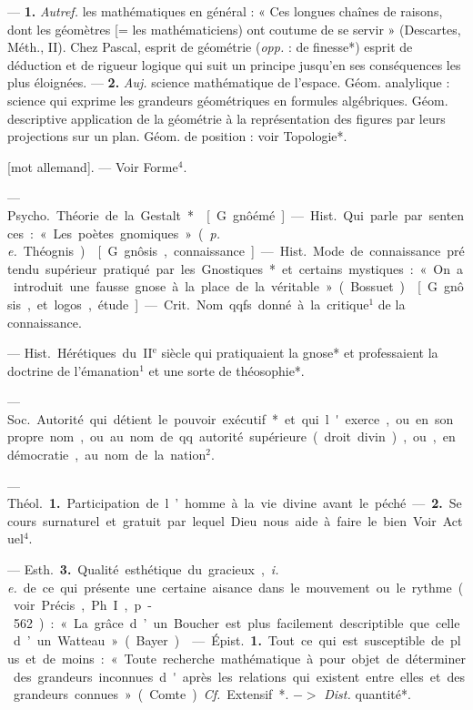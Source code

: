 \begin{itemize}[leftmargin=1cm, label=, itemsep=1pt]
 — {\bf 1.} {\it Autref.} les mathématiques en général : « Ces longues
chaînes de raisons, dont les géomètres [= les mathématiciens) ont
coutume de se servir » (Descartes,
Méth., II). Chez Pascal, esprit de
géométrie ({\it opp.} : de finesse*)
esprit de déduction et de rigueur
logique qui suit un principe jusqu'en ses conséquences les plus
éloignées. — {\bf 2.} {\it Auj.} science mathématique de l’espace. Géom. analylique : science qui exprime les
grandeurs géométriques en formules
algébriques. Géom. descriptive
application de la géométrie à la représentation des figures par leurs
projections sur un plan. Géom. de
position : voir Topologie*.

 [mot allemand]. — Voir Forme$^4$.

 — \si{Psycho.} Théorie de la
Gestalt*.

 [G. gnôémé]. — \si{Hist.} Qui
parle par sentences : « Les poètes
gnomiques » ({\it p. e.} Théognis).

 [G. gnôsis, connaissance]. —
\si{Hist.} Mode de connaissance prétendu supérieur pratiqué par les
Gnostiques* et certains mystiques :
« On a introduit une fausse gnose à
la place de la véritable » (Bossuet).

 [G. gnôsis, et logos, étude].
— \si{Crit.} Nom qqfs. donné à la critique$^1$ de la connaissance.

 — \si{Hist.} Hérétiques du
{\footnotesize II}$^\text{e}$ siècle qui pratiquaient la gnose*
et professaient la doctrine de l’émanation$^1$ et une sorte de théosophie*.

 — \si{Soc.} Autorité qui
détient le pouvoir exécutif* et qui
l'exerce, ou en son propre nom,
ou au nom de qq. autorité supérieure (droit divin), ou, en démocratie, au nom de la nation$^2$.

 — \si{Théol.} {\bf 1.} Participation de
l’homme à la vie divine avant le
péché. — {\bf 2.} Secours surnaturel et
gratuit par lequel Dieu nous aide à
faire le bien. Voir Actuel$^4$.

— \si{Esth.} {\bf 3.} Qualité esthétique du
gracieux, {\it i. e.} de ce qui présente une
certaine aisance dans le mouvement
ou le rythme (voir Précis, Ph. I,
p- 562) : « La grâce d’un Boucher est
plus facilement descriptible que
celle d’un Watteau » (Bayer).

 — \si{Épist.} {\bf 1.} Tout ce qui est
susceptible de plus et de moins :
« Toute recherche mathématique à
pour objet de déterminer des grandeurs inconnues d'après les relations qui existent entre elles et des
grandeurs connues » (Comte). {\it Cf.}
Extensif*. $->$ {\it Dist.} quantité*.


\end{itemize}
